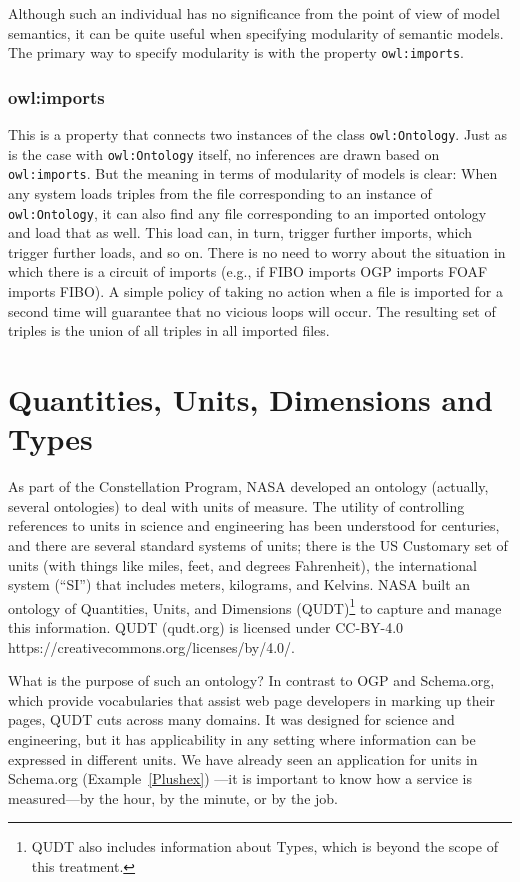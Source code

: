 Although such an individual has no significance from the point of view
of model semantics, it can
be quite useful when specifying modularity of semantic models. The
primary way to specify modularity is with the property \texttt{owl:imports}.

\subsubsection{owl:imports}

This is a property that connects two instances of the class
\texttt{owl:Ontology}. Just as is the case with \texttt{owl:Ontology} itself, no
inferences are drawn based on \texttt{owl:imports}. But the meaning in terms of
modularity of models is clear: When any system loads triples from the
file corresponding to an instance of \texttt{owl:Ontology}, it can also find any
file corresponding to an imported ontology and load that as well. This
load can, in turn, trigger further imports, which trigger further loads,
and so on. There is no need to worry about the situation in which there
is a circuit of imports (e.g., if FIBO imports OGP imports FOAF imports FIBO).
A simple policy of taking no action when a file is imported for a second
time will guarantee that no vicious loops will occur. The resulting set
of triples is the union of all triples in all imported files.




\section{Quantities, Units, Dimensions and Types}
\label{QUDT}

As part of the Constellation Program, NASA developed an ontology 
(actually, several ontologies) to deal
with units of measure. The utility of controlling references to units in
science and engineering has been understood for centuries, and there are
several standard systems of units; there is the US Customary set of
units (with things like miles, feet, and degrees Fahrenheit), the
international system (``SI'') that includes meters, kilograms, and
Kelvins. NASA built an ontology of Quantities, Units, and Dimensions
(QUDT)\footnote{QUDT also includes information about Types, which is beyond the scope
of this treatment.}
to capture and manage this information.  QUDT (qudt.org) is licensed under CC-BY-4.0 https://creativecommons.org/licenses/by/4.0/. 

What is the purpose of such an ontology? In contrast to OGP and Schema.org, 
which provide vocabularies that assist web page developers in
marking up their pages, QUDT cuts across many domains. It was designed
for science and engineering, but it has applicability in any setting
where information can be expressed in different units. We have already
seen an application for units in Schema.org (Example~\ref{Plushex}) 
---it is
important to know how a service is measured---by the hour, by the
minute, or by the job.

